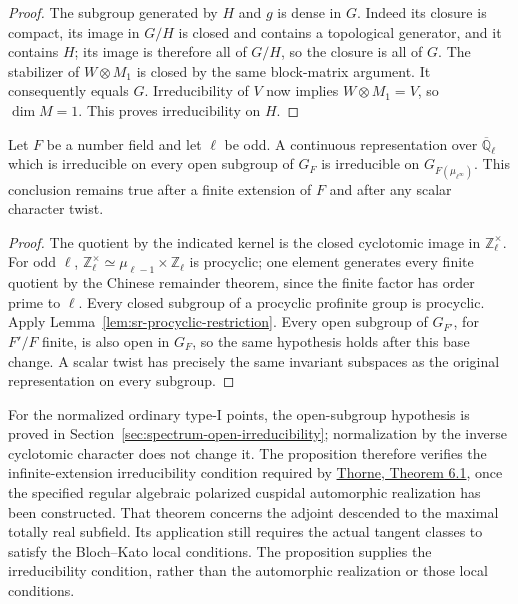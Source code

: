 \begin{proof}
The subgroup generated by \(H\) and \(g\) is dense in \(G\).
Indeed its closure is compact, its image in \(G/H\) is closed and
contains a topological generator, and it contains \(H\);
its image is therefore all of \(G/H\), so the closure is all of \(G\).
The stabilizer of \(W\otimes M_1\) is closed by the same block-matrix
argument. It consequently equals \(G\).
Irreducibility of \(V\) now implies \(W\otimes M_1=V\), so
\(\dim M=1\). This proves irreducibility on \(H\).
\end{proof}

\begin{srproposition}\label{prop:sr-cyclotomic-restriction}
Let \(F\) be a number field and let \(\ell\) be odd.
A continuous representation over \(\overline{\mathbb Q}_\ell\)
which is irreducible on every open subgroup of \(G_F\)
is irreducible on \(G_{F(\mu_{\ell^\infty})}\).
This conclusion remains true after a finite extension of \(F\)
and after any scalar character twist.
\end{srproposition}
\begin{proof}
The quotient by the indicated kernel is the closed cyclotomic
image in \(\mathbb Z_\ell^\times\).
For odd \(\ell\),
\(\mathbb Z_\ell^\times\simeq\mu_{\ell-1}\times\mathbb Z_\ell\)
is procyclic; one element generates every finite quotient by
the Chinese remainder theorem, since the finite factor has
order prime to \(\ell\).
Every closed subgroup of a procyclic profinite group is procyclic.
Apply Lemma~\ref{lem:sr-procyclic-restriction}.
Every open subgroup of \(G_{F'}\), for \(F'/F\) finite, is also
open in \(G_F\), so the same hypothesis holds after this base change.
A scalar twist has precisely the same invariant subspaces as the
original representation on every subgroup.
\end{proof}

For the normalized ordinary type-I points, the open-subgroup
hypothesis is proved in
Section~\ref{sec:spectrum-open-irreducibility}; normalization by
the inverse cyclotomic character does not change it.
The proposition therefore verifies the infinite-extension
irreducibility condition required by
\href{https://arxiv.org/pdf/2207.04925}{Thorne, Theorem 6.1},
once the specified regular algebraic polarized cuspidal
automorphic realization has been constructed.
That theorem concerns the adjoint descended to the maximal
totally real subfield.
Its application still requires the actual tangent classes to
satisfy the Bloch--Kato local conditions.
The proposition supplies the irreducibility condition, rather
than the automorphic realization or those local conditions.

